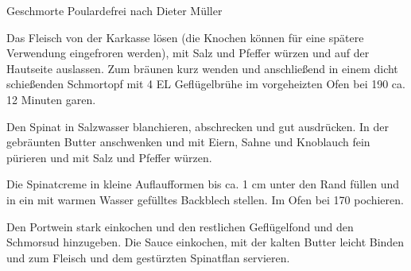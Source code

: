 \begin{recipe}{Geschmorte Poularde}{frei nach Dieter Müller}
  \label{Geschmorte Poulardenbrust}


  \steps
  Das Fleisch von der Karkasse lösen (die Knochen können für eine spätere Verwendung
  eingefroren werden), mit Salz und Pfeffer würzen und auf der Hautseite auslassen. Zum
  bräunen kurz wenden und anschließend in einem dicht schießenden Schmortopf mit 4 EL
  Geflügelbrühe im vorgeheizten Ofen bei 190 \celsius ca. 12 Minuten garen.

  Den Spinat in Salzwasser blanchieren, abschrecken und gut ausdrücken. In der gebräunten
  Butter anschwenken und mit Eiern, Sahne und Knoblauch fein pürieren und mit Salz und
  Pfeffer würzen.

  Die Spinatcreme in kleine Auflaufformen bis ca. 1 cm unter den Rand füllen und in ein
  mit warmen Wasser gefülltes Backblech stellen. Im Ofen bei 170 \celsius pochieren.

  Den Portwein stark einkochen und den restlichen Geflügelfond und den Schmorsud
  hinzugeben. Die Sauce einkochen, mit der kalten Butter leicht Binden und zum Fleisch
  und dem gestürzten Spinatflan servieren.
\end{recipe}
